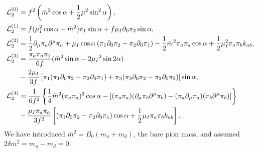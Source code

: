 \begin{align}
\mathcal{L}_2^{(0)}
&  =
    f^2   
    \left(
        \bar m^2 \cos{\alpha}
        + \frac{1}{2} \mu^2 \sin^2{\alpha}
    \right),
    \label{L0}
\\
\label{L1}
\mathcal{L}_2^{(1)}
& =
    f 
    (
        \mu_I^2\cos{\alpha}
        - \bar m^2
    ) \pi_1 \sin{\alpha}
    + f \mu_I \partial_0\pi_2 \sin{\alpha},
\\
\mathcal{L}_2^{(2)}
& =
    \frac{1}{2} \partial_\mu\pi_a\partial^\mu\pi_a
    + \mu_I \cos{\alpha} \left( \pi_1 \partial_0\pi_2 - \pi_2\partial_0\pi_1 \right)
    - \frac{1}{2} \bar m^2 \pi_a \pi_a \cos{\alpha}
    + \frac{1}{2} \mu_I ^2 \pi_a \pi_b k_{ab},
\label{L2}
\\
\notag
\mathcal{L}_2^{(3)}
& =
    \frac{\pi_a\pi_a \pi_1}{6f}
    (\bar m^2 \sin{\alpha}-2\mu_I{}^2 \sin{2\alpha})\\ \label{L3}
    &
    -
    \frac{2 \mu_I}{3 f}
    \left[
        \pi_1(\pi_1 \partial_0\pi_2 - \pi_2\partial_0\pi_1)
        +
        \pi_3(\pi_3\partial_0\pi_2-\pi_2 \partial_0\pi_3)
    \right]
    \sin{\alpha},
\\
\notag
\mathcal{L}_2^{(4)}
& =
\frac{1}{6f^2}
\left\{     
    \frac{1}{4} \bar m^2 (\pi_a\pi_a)^2 \cos{\alpha}
    -
    \left[
        (\pi_a \pi_a) (\partial_\mu \pi_b \partial^\mu \pi_b )
        - (\pi_a \partial_\mu \pi_a)(\pi_b \partial^\mu \pi_b )
    \right]
 \right\}
\\
&
- \frac{\mu_I \pi_a\pi_a}{3f^2}
\left[
    \left(\pi_1\partial_0 \pi_2 - \pi_2 \partial_0 \pi_1\right)
    \cos{\alpha}
    + \frac{1}{2} \mu_I \pi_a \pi_b k_{ab}
\right].
\label{L4}
\end{align}
We have introduced $\bar m^2 = B_0 (m_u + m_d)$, the bare pion mass, and assumed $2\delta m^2 = m_u - m_d = 0$.
